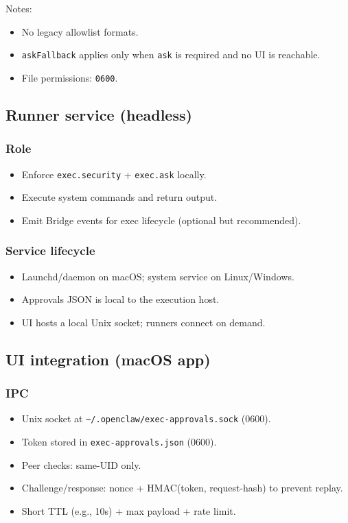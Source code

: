 Notes:

\begin{itemize}
  \item No legacy allowlist formats.
  \item \texttt{askFallback} applies only when \texttt{ask} is required and no UI is reachable.
  \item File permissions: \texttt{0600}.
\end{itemize}


\subsection{Runner service (headless)}


\subsubsection{Role}


\begin{itemize}
  \item Enforce \texttt{exec.security} + \texttt{exec.ask} locally.
  \item Execute system commands and return output.
  \item Emit Bridge events for exec lifecycle (optional but recommended).
\end{itemize}


\subsubsection{Service lifecycle}


\begin{itemize}
  \item Launchd/daemon on macOS; system service on Linux/Windows.
  \item Approvals JSON is local to the execution host.
  \item UI hosts a local Unix socket; runners connect on demand.
\end{itemize}


\subsection{UI integration (macOS app)}


\subsubsection{IPC}


\begin{itemize}
  \item Unix socket at \texttt{\textasciitilde{}/.openclaw/exec-approvals.sock} (0600).
  \item Token stored in \texttt{exec-approvals.json} (0600).
  \item Peer checks: same-UID only.
  \item Challenge/response: nonce + HMAC(token, request-hash) to prevent replay.
  \item Short TTL (e.g., 10s) + max payload + rate limit.
\end{itemize}


